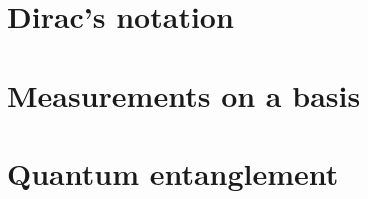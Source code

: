 \section{Dirac's notation}
    \lipsum[8]
\section{Measurements on a  basis}
    \lipsum[7]
\section{Quantum entanglement}
